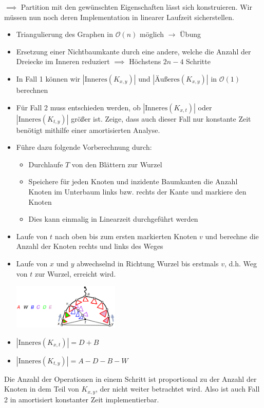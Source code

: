 $\implies$ Partition mit den gewünschten Eigenschaften lässt sich konstruieren. Wir müssen nun noch deren Implementation in linearer Laufzeit sicherstellen.

\begin{itemize}
	\item Triangulierung des Graphen in $\mathcal{O}(n)$ möglich $\rightarrow$ Übung
	\item Ersetzung einer Nichtbaumkante durch eine andere, welche die Anzahl der Dreiecke im Inneren reduziert $\implies$ Höchstens $2n-4$ Schritte
	\item In Fall 1 können wir $|\text{Inneres}(K_{x,y})|$ und $|\text{Äußeres}(K_{x,y})|$ in $\mathcal{O}(1)$ berechnen
	\item Für Fall 2 muss entschieden werden, ob $|\text{Inneres}(K_{x,t})|$ oder $|\text{Inneres}(K_{t,y})|$ größer ist. Zeige, dass auch dieser Fall nur konstante Zeit benötigt mithilfe einer amortisierten Analyse.
	\item Führe dazu folgende Vorberechnung durch:
	\begin{itemize}
		\item Durchlaufe $T$ von den Blättern zur Wurzel
		\item Speichere für jeden Knoten und inzidente Baumkanten die Anzahl Knoten im Unterbaum links bzw. rechts der Kante und markiere den Knoten
		\item Dies kann einmalig in Linearzeit durchgeführt werden
	\end{itemize}
	\item Laufe von $t$ nach oben bis zum ersten markierten Knoten $v$ und berechne die Anzahl der Knoten rechts und links des Weges
	\item Laufe von $x$ und $y$ abwechselnd in Richtung Wurzel bis erstmals $v$, d.h. Weg von $t$ zur Wurzel, erreicht wird.
	\begin{center}
		\includegraphics[width=0.4\textwidth]{images/pst-6.png}
	\end{center}
	\item $|\text{Inneres}(K_{x,t})|=D+B$
	\item $|\text{Inneres}(K_{t,y})|=A-D-B-W$
\end{itemize}
\bigskip
Die Anzahl der Operationen in einem Schritt ist proportional zu der Anzahl der Knoten in dem Teil von $K_{x,y}$, der nicht weiter betrachtet wird. Also ist auch Fall 2 in amortisiert konstanter Zeit implementierbar.

